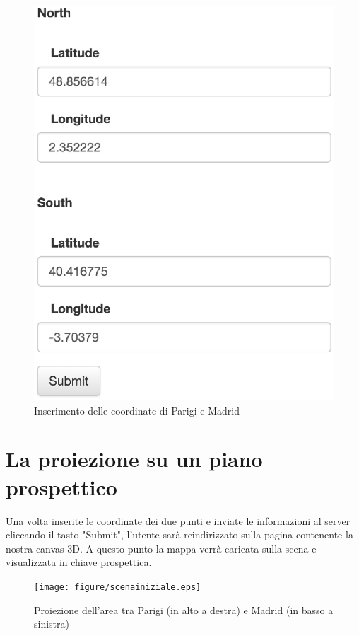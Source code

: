 \begin{figure}[H]
	\centering
	\includegraphics[scale=0.5]{figure/formexample_1.eps}
	\caption{Inserimento delle coordinate di Parigi e Madrid}
\end{figure}

\section{La proiezione su un piano prospettico}
Una volta inserite le coordinate dei due punti e inviate le informazioni al server cliccando il tasto "Submit", l'utente sarà reindirizzato sulla pagina contenente la nostra canvas 3D. A questo punto la mappa verrà caricata sulla scena e visualizzata in chiave prospettica.

\begin{figure}[H]
	\centering
	\texttt{[image: figure/scenainiziale.eps]}
	\caption{Proiezione dell'area tra Parigi (in alto a destra) e Madrid (in basso a sinistra)}
\end{figure}

